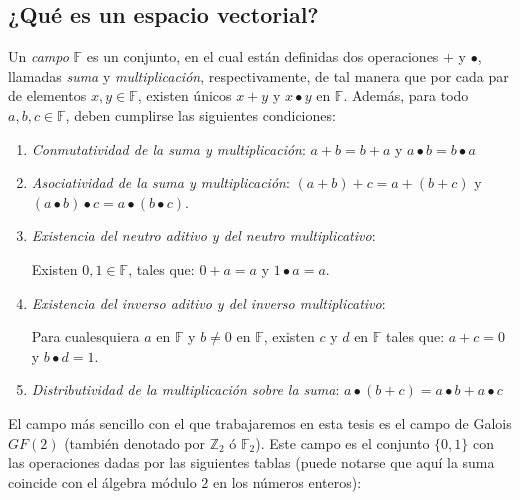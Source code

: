         \subsection{¿Qué es un espacio vectorial?}
            Un \textit{campo} $\mathbb{F}$ es un conjunto, en el cual están definidas dos operaciones  $+$ y $\bullet$, llamadas \textit{suma} y \textit{multiplicación}, respectivamente, de tal manera que por cada par de elementos $x,y \in \mathbb{F}$, existen únicos $x+y$ y $x \bullet y$ en $\mathbb{F}$. Además, para todo $a,b,c \in \mathbb{F}$, deben cumplirse las siguientes condiciones: 
                \begin{enumerate}
                    \item \textit{Conmutatividad de la suma y multiplicación}:
                        $a + b = b + a$  y  $a \bullet b = b \bullet a$
                    \item \textit{Asociatividad de la suma y multiplicación}:
                        $(a + b) + c = a + (b + c)$  y  $(a \bullet b)\bullet c = a\bullet(b \bullet c)$.
                    \item \textit{Existencia del neutro aditivo y del neutro multiplicativo}:
    
                        Existen  $0, 1 \in\mathbb{F}$, tales que:
                         $0 + a = a$  y  $1 \bullet a = a$.
    
                    \item \textit{Existencia del inverso aditivo y del inverso multiplicativo}:
    
                        Para cualesquiera $a$ en $\mathbb{F}$ y  $b \neq 0$ en $\mathbb{F}$, existen $c$ y $d$ en $\mathbb{F}$ tales que:
                        $a + c  =  0$  y  $b \bullet d  =  1$.
                        
                    \item \textit{Distributividad de la multiplicación sobre la suma}:
                        $a \bullet(b + c)  = a \bullet b  +  a \bullet c$
                 \end{enumerate}

            El campo más sencillo con el que trabajaremos en esta tesis es el campo de Galois $GF(2)$ (también denotado por $\mathbb{Z}_{2}$ ó $\mathbb{F}_{2}$). Este campo es el conjunto $\{0,1\}$ con las operaciones dadas por las siguientes tablas (puede notarse que aquí la suma coincide con el álgebra módulo $2$ en los números enteros):


